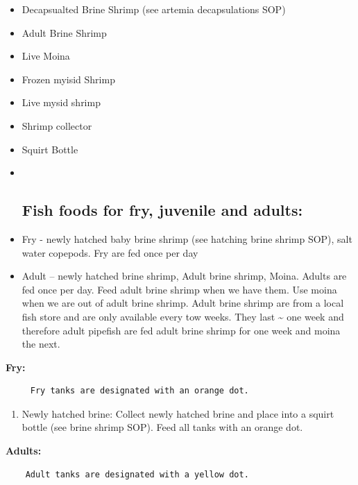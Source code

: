\documentclass[
]{book}
\providecommand{\tightlist}{%
  \setlength{\itemsep}{0pt}\setlength{\parskip}{0pt}}
\begin{document}
\begin{itemize}
\item
  Decapsualted Brine Shrimp (see artemia decapsulations SOP)
\item
  Adult Brine Shrimp
\item
  Live Moina
\item
  Frozen myisid Shrimp
\item
  Live mysid shrimp
\item
  Shrimp collector
\item
  Squirt Bottle
\item ~
  \hypertarget{fish-foods-for-fry-juvenile-and-adults}{%
  \subsection{Fish foods for fry, juvenile and adults:}\label{fish-foods-for-fry-juvenile-and-adults}}
\item
  Fry - newly hatched baby brine shrimp (see hatching brine shrimp SOP), salt water copepods. Fry are fed once per day
\item
  Adult -- newly hatched brine shrimp, Adult brine shrimp, Moina. Adults are fed once per day. Feed adult brine shrimp when we have them. Use moina when we are out of adult brine shrimp. Adult brine shrimp are from a local fish store and are only available every tow weeks. They last \textasciitilde{} one week and therefore adult pipefish are fed adult brine shrimp for one week and moina the next.
\end{itemize}

\textbf{Fry:}

\begin{verbatim}
     Fry tanks are designated with an orange dot. 
\end{verbatim}

\begin{enumerate}
\def\labelenumi{\arabic{enumi}.}
\tightlist
\item
  Newly hatched brine: Collect newly hatched brine and place into a squirt bottle (see brine shrimp SOP). Feed all tanks with an orange dot.
\end{enumerate}

\textbf{Adults:}

\begin{verbatim}
    Adult tanks are designated with a yellow dot. 
\end{verbatim}
\end{document}
